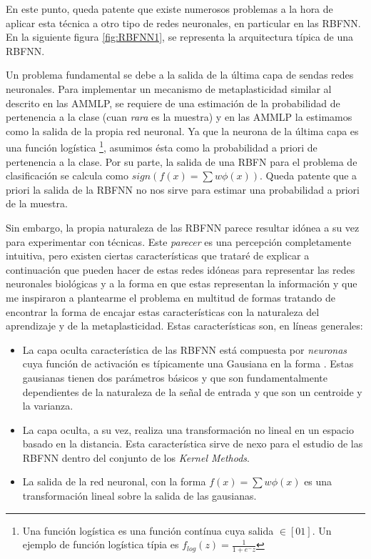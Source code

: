 \documentclass[10pt,a4paper, twocolumn]{report}
\begin{document}
En este punto, queda patente que existe numerosos problemas a la hora de aplicar esta técnica a otro tipo de redes neuronales, en particular en las RBFNN. En la siguiente figura \ref{fig:RBFNN1}, se representa la arquitectura típica de una RBFNN.

Un problema fundamental se debe a la salida de la última capa de sendas redes neuronales. Para implementar un mecanismo de metaplasticidad similar al descrito en las AMMLP, se requiere de una estimación de la probabilidad de pertenencia a la clase (cuan \textit{rara} es la muestra) y en las AMMLP la estimamos como la salida de la propia red neuronal. Ya que la neurona de la última capa es una función logística \footnote{Una función logística es una función contínua cuya salida $\in [0 1]$. Un ejemplo de función logística típia es $f_{log}(z)=\frac{1}{1+e^-z}$}, asumimos ésta como la probabilidad a priori de pertenencia a la clase. Por su parte, la salida de una RBFN para el problema de clasificación se calcula como $sign(f(x)=\sum w \phi(x))$. Queda patente que a priori la salida de la RBFNN no nos sirve para estimar una probabilidad a priori de la muestra.

Sin embargo, la propia naturaleza de las RBFNN parece resultar idónea a su vez para experimentar con técnicas. Este \textit{parecer} es una percepción completamente intuitiva, pero existen ciertas características que trataré de explicar a continuación que pueden hacer de estas redes idóneas para representar las redes neuronales biológicas y a la forma en que estas representan la información y que me inspiraron a plantearme el problema en multitud de formas tratando de encontrar la forma de encajar estas características con la naturaleza del aprendizaje y de la metaplasticidad. Estas características son, en líneas generales:
\begin{itemize}
	\item La capa oculta característica de las RBFNN está compuesta por \textit{neuronas} cuya función de activación es típicamente una Gausiana en la forma . Estas gausianas tienen dos parámetros básicos y que son fundamentalmente dependientes de la naturaleza de la señal de entrada y que son un centroide y la varianza.
	\item La capa oculta, a su vez, realiza una transformación no lineal en un espacio basado en la distancia. Esta característica sirve de nexo para el estudio de las RBFNN dentro del conjunto de los \textit{Kernel Methods}.
	\item La salida de la red neuronal, con la forma $f(x)=\sum w \phi(x)$ es una transformación lineal sobre la salida de las gausianas. 
\end{itemize}
\end{document}
